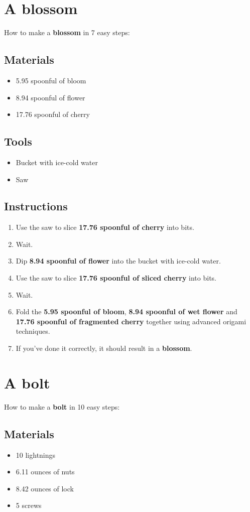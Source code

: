 \documentclass{article}
\begin{document}
\section{A blossom}How to make a \textbf{blossom} in 7 easy steps:

\subsection{Materials}\begin{itemize}
\item 
5.95 spoonful of bloom
\item 
8.94 spoonful of flower
\item 
17.76 spoonful of cherry
\end{itemize}
\subsection{Tools}\begin{itemize}
\item 
Bucket with ice-cold water
\item 
Saw
\end{itemize}
\subsection{Instructions}\begin{enumerate}
\item 
Use the saw to slice \textbf{17.76 spoonful of cherry} into bits.
\item 
Wait.
\item 
Dip \textbf{8.94 spoonful of flower} into the bucket with ice-cold water.
\item 
Use the saw to slice \textbf{17.76 spoonful of sliced cherry} into bits.
\item 
Wait.
\item 
Fold the \textbf{5.95 spoonful of bloom}, \textbf{8.94 spoonful of wet flower} and \textbf{17.76 spoonful of fragmented cherry} together using advanced origami techniques.
\item 
If you've done it correctly, it should result in a \textbf{blossom}.
\end{enumerate}
\newpage
\section{A bolt}How to make a \textbf{bolt} in 10 easy steps:

\subsection{Materials}\begin{itemize}
\item 
10 lightnings
\item 
6.11 ounces of nuts
\item 
8.42 ounces of lock
\item 
5 screws
\end{itemize}
\end{document}

